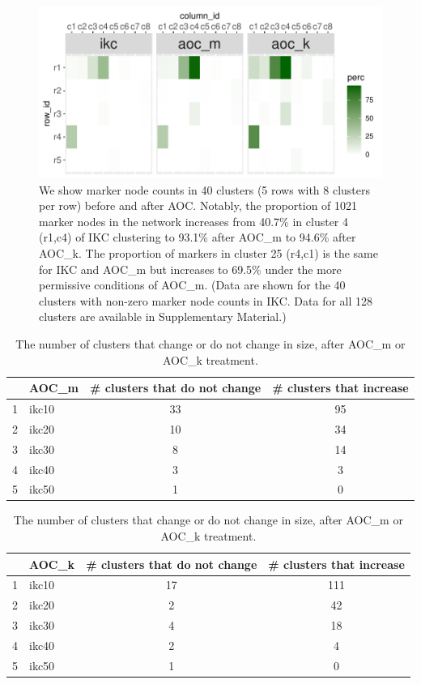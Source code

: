 \documentclass[12pt, oneside]{article}   	%
\begin{document}
	\begin{figure}[H]
		\centering
		\includegraphics[width=0.7\linewidth]{marker_comps_wide.pdf} 
		\caption{We show marker node counts in 40 clusters (5 rows with 8 clusters per row) before and after AOC.  Notably, the proportion of 1021 marker nodes in the network increases from 40.7\% in cluster 4 (r1,c4) of IKC clustering to 93.1\% after AOC\_m to 94.6\% after AOC\_k. The proportion of markers in cluster 25 (r4,c1) is the same for IKC and AOC\_m but increases to  69.5\% under the more permissive conditions of AOC\_m. (Data are shown for the 40 clusters with non-zero marker node counts in IKC. Data for all 128 clusters are available in Supplementary Material.)}
		\label{fig:marker-node-concentration}
	\end{figure}
	
	\clearpage
	\begin{table}[H]
		\centering
		\begin{tabular}{rlcc}
			\hline
			& AOC\_m & \# clusters that do not change & \# clusters that increase\\ 
			\hline
			1 & ikc10 &  33 &  95 \\ 
			2 & ikc20 &  10 &  34 \\ 
			3 & ikc30 &   8 &  14 \\ 
			4 & ikc40 &   3 &   3 \\ 
			5 & ikc50 &   1 &   0 \\ 
			\hline
		\end{tabular}
		\quad
		\begin{tabular}{rlcc}
			\hline
			& AOC\_k& \# clusters that do not change & \# clusters that increase \\ 
			\hline
			1 & ikc10 &  17 & 111 \\ 
			2 & ikc20 &   2 &  42 \\ 
			3 & ikc30 &   4 &  18 \\ 
			4 & ikc40 &   2 &   4 \\ 
			5 & ikc50 &   1 &   0 \\ 
			\hline
		\end{tabular}
		\caption{The number of clusters that change or do not change in size, after AOC\_m or AOC\_k treatment.}
		\label{tab:tab-change-no-change}
	\end{table}
	
\end{document}
